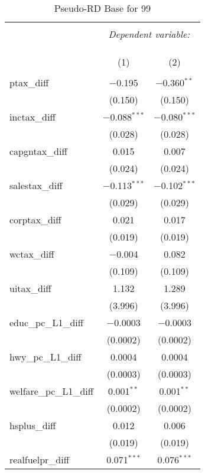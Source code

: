 
\begin{table}[!htbp] \centering 
  \caption{Pseudo-RD Base for  99} 
  \label{} 
\begin{tabular}{@{\extracolsep{5pt}}lcc} 
\\[-1.8ex]\hline 
\hline \\[-1.8ex] 
 & \multicolumn{2}{c}{\textit{Dependent variable:}} \\ 
\cline{2-3} 
\\[-1.8ex] & \multicolumn{2}{c}{ } \\ 
\\[-1.8ex] & (1) & (2)\\ 
\hline \\[-1.8ex] 
 ptax\_diff & $-$0.195 & $-$0.360$^{**}$ \\ 
  & (0.150) & (0.150) \\ 
  inctax\_diff & $-$0.088$^{***}$ & $-$0.080$^{***}$ \\ 
  & (0.028) & (0.028) \\ 
  capgntax\_diff & 0.015 & 0.007 \\ 
  & (0.024) & (0.024) \\ 
  salestax\_diff & $-$0.113$^{***}$ & $-$0.102$^{***}$ \\ 
  & (0.029) & (0.029) \\ 
  corptax\_diff & 0.021 & 0.017 \\ 
  & (0.019) & (0.019) \\ 
  wctax\_diff & $-$0.004 & 0.082 \\ 
  & (0.109) & (0.109) \\ 
  uitax\_diff & 1.132 & 1.289 \\ 
  & (3.996) & (3.996) \\ 
  educ\_pc\_L1\_diff & $-$0.0003 & $-$0.0003 \\ 
  & (0.0002) & (0.0002) \\ 
  hwy\_pc\_L1\_diff & 0.0004 & 0.0004 \\ 
  & (0.0003) & (0.0003) \\ 
  welfare\_pc\_L1\_diff & 0.001$^{**}$ & 0.001$^{**}$ \\ 
  & (0.0002) & (0.0002) \\ 
  hsplus\_diff & 0.012 & 0.006 \\ 
  & (0.019) & (0.019) \\ 
  realfuelpr\_diff & 0.071$^{***}$ & 0.076$^{***}$ \\ 

\end{tabular}
\end{table}
